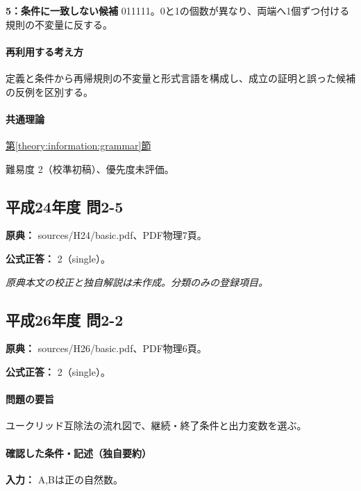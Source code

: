 \noindent\textbf{5：条件に一致しない候補} 011111。0と1の個数が異なり、両端へ1個ずつ付ける規則の不変量に反する。\par

\paragraph{再利用する考え方} 定義と条件から再帰規則の不変量と形式言語を構成し、成立の証明と誤った候補の反例を区別する。

\paragraph{共通理論} \hyperref[theory:information:grammar]{第\ref*{theory:information:grammar}節}

\par 難易度 2（校準初稿）、優先度未評価。

\subsection{平成24年度 問2-5}
\label{q:h24-reg-basic-2-5}

\noindent\textbf{原典：} sources/H24/basic.pdf、PDF物理7頁。

\textbf{公式正答：} 2（single）。

\par\textit{原典本文の校正と独自解説は未作成。分類のみの登録項目。}

\subsection{平成26年度 問2-2}
\label{q:h26-reg-basic-2-2}

\noindent\textbf{原典：} sources/H26/basic.pdf、PDF物理6頁。

\textbf{公式正答：} 2（single）。

\paragraph{問題の要旨} ユークリッド互除法の流れ図で、継続・終了条件と出力変数を選ぶ。

\paragraph{確認した条件・記述（独自要約）}\mbox{}\par

\noindent\textbf{入力：} A,Bは正の自然数。\par

